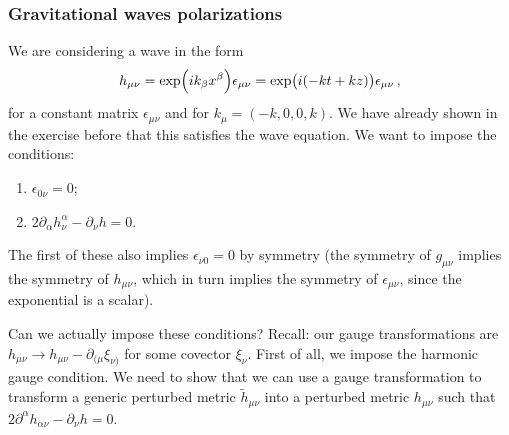 \documentclass[main.tex]{subfiles}
\begin{document}
\subsubsection{Gravitational waves polarizations}

We are considering a wave in the form 
%
\begin{align}
h_{\mu \nu } = \exp(i k_{\beta } x^{\beta }) \epsilon_{\mu \nu } = \exp(i \qty(- k t + kz)) \epsilon_{\mu \nu }
\,,
\end{align}
%
for a constant matrix \(\epsilon_{\mu \nu }\) and for \(k_{\mu } = (-k, 0,0,k)\). We have already shown in the exercise before that this satisfies the wave equation. We want to impose the conditions: 
\begin{enumerate}
    \item \(\epsilon_{0 \nu } = 0\);
    \item \(2\partial_{\alpha } h^{\alpha }_{\nu } - \partial_{\nu } h = 0\). 
\end{enumerate}

The first of these also implies \(\epsilon_{\nu 0} = 0\) by symmetry (the symmetry of \(g_{\mu \nu } \) implies the symmetry of \(h_{\mu \nu }\), which in turn implies the symmetry of \(\epsilon_{\mu \nu }\), since the exponential is a scalar).

Can we actually impose these conditions? Recall: our gauge transformations are \(h_{\mu \nu } \rightarrow h_{\mu \nu } - \partial_{(\mu  } \xi_{\nu )}\) for some covector \(\xi_{ \nu }\). 
First of all, we impose the harmonic gauge condition. We need to show that we can use a gauge transformation to transform a generic perturbed metric \(\widetilde{h}_{\mu \nu }\) into a perturbed metric \(h_{\mu \nu }\) such that \(2 \partial^{\alpha } h_{\alpha\nu } - \partial_{\nu }  h = 0\).
\end{document}
